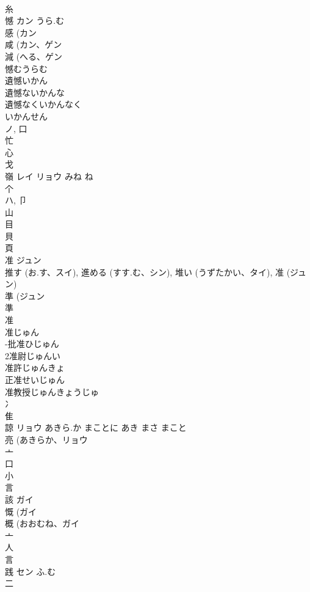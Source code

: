 \documentclass[8pt]{extreport}
\begin{document}
\begin{CJK}{UTF8}{min}
\\	糸 
\\	憾	カン	うら.む	
\\	感 (カン 
\\	咸 (カン、ゲン 
\\	減 (へる、ゲン 
\\	憾むうらむ
\\	遺憾いかん
\\	遺憾ないかんな
\\	遺憾なくいかんなく
\\	いかんせん
\\	ノ, 口 
\\	忙 
\\	心 
\\	戈 
\\	嶺	レイ リョウ	みね ね	
\\	个 
\\	ハ, 卩 
\\	山 
\\	目 
\\	貝 
\\	頁 
\\	准	ジュン		
\\	推す (お.す、スイ), 進める (すす.む、シン), 堆い (うずたかい、タイ), 准 (ジュン) 
\\	準 (ジュン 
\\	準 
\\	准 
\\	准じゅん
\\	-批准ひじゅん
\\	2准尉じゅんい
\\	准許じゅんきょ
\\	正准せいじゅん
\\	准教授じゅんきょうじゅ
\\	冫 
\\	隹 
\\	諒	リョウ	あきら.か まことに あき まさ まこと	
\\	亮 (あきらか、リョウ 
\\	亠 
\\	口 
\\	小 
\\	言 
\\	該	ガイ		
\\	慨 (ガイ 
\\	概 (おおむね、ガイ 
\\	亠 
\\	人 
\\	言 
\\	践	セン	ふ.む	
\\	二 

\end{CJK}
\end{document}
